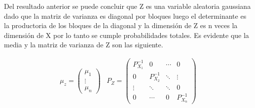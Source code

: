 	Del resultado anterior se puede concluir que Z es una variable aleatoria gaussiana dado que la matriz de varianza es diagonal por bloques luego el determinante es la productoria de los bloques de la diagonal y la dimensión de Z es n veces la dimensión de X por lo tanto se cumple probabilidades totales.  Es evidente que la media y la matriz de varianza de Z son las siguiente.

	\begin{eqnarray}
		\mu_z = \begin{pmatrix}
			   \mu_1 \\
			  \vdots \\
			  \mu_n 
			 \end{pmatrix}\;\;\;
		P_Z =  \begin{pmatrix}
			  P_{X_1}^{-1} & 0 & \cdots & 0 \\
			  0 & P_{X_2}^{-1} &  \ddots & \vdots\\
			   \vdots & \ddots &\ddots  & 0\\
			   0 & \cdots &  0 & P_{X_n}^{-1}
			 \end{pmatrix}
	\end{eqnarray}







